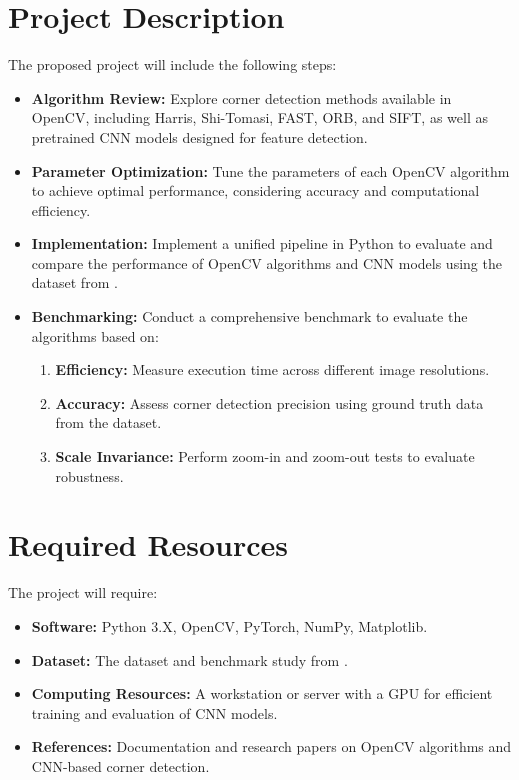 \documentclass[journal]{IEEEtran}
\begin{document}
\section{Project Description}
The proposed project will include the following steps:
\begin{itemize}
    \item \textbf{Algorithm Review:} Explore corner detection methods available in OpenCV, including Harris, Shi-Tomasi, FAST, ORB, and SIFT, as well as pretrained CNN models designed for feature detection.
    \item \textbf{Parameter Optimization:} Tune the parameters of each OpenCV algorithm to achieve optimal performance, considering accuracy and computational efficiency.
    \item \textbf{Implementation:} Implement a unified pipeline in Python to evaluate and compare the performance of OpenCV algorithms and CNN models using the dataset from \cite{mdpi_dataset}.
    \item \textbf{Benchmarking:} Conduct a comprehensive benchmark to evaluate the algorithms based on:
    \begin{enumerate}
        \item \textbf{Efficiency:} Measure execution time across different image resolutions.
        \item \textbf{Accuracy:} Assess corner detection precision using ground truth data from the dataset.
        \item \textbf{Scale Invariance:} Perform zoom-in and zoom-out tests to evaluate robustness.
    \end{enumerate}
\end{itemize}

\section{Required Resources}
The project will require:
\begin{itemize}
    \item \textbf{Software:} Python 3.X, OpenCV, PyTorch, NumPy, Matplotlib.
    \item \textbf{Dataset:} The dataset and benchmark study from \cite{mdpi_dataset}.
    \item \textbf{Computing Resources:} A workstation or server with a GPU for efficient training and evaluation of CNN models.
    \item \textbf{References:} Documentation and research papers on OpenCV algorithms and CNN-based corner detection.
\end{itemize}
\end{document}

